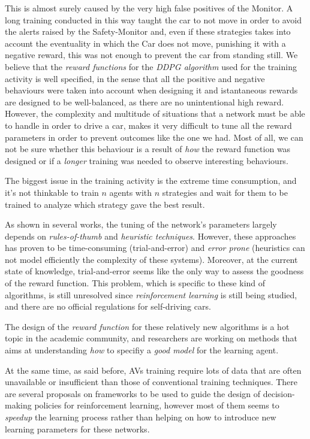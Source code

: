 This is almost surely caused by the very high false positives of the Monitor. A long training conducted in this way taught the car to not move in order to avoid the alerts raised by the Safety-Monitor and, even if these strategies takes into account the eventuality in which the Car does not move, punishing it with a negative reward, this was not enough to prevent the car from standing still.
We believe that the \textsl{reward functions} for the \textsl{DDPG algorithm} used for the training activity is well specified, in the sense that all the positive and negative behaviours were taken into account when designing it and istantaneous rewards are designed to be well-balanced, as there are no unintentional high reward. However, the complexity and multitude of situations that a network must be able to handle in order to drive a car, makes it very difficult to tune all the reward parameters in order to prevent outcomes like the one we had. Most of all, we can not be sure whether this behaviour is a result of \textsl{how} the reward function was designed or if a \textsl{longer} training was needed to observe interesting behaviours.

The biggest issue in the training activity is the extreme time consumption, and it's not thinkable to train $n$ agents with $n$ strategies and wait for them to be trained to analyze which strategy gave the best result.

As shown in several works, the tuning of the network's parameters largely depends on \textsl{rules-of-thumb} and \textsl{heuristic techniques}. However, these approaches has proven to be time-consuming (trial-and-error) and \textsl{error prone} (heuristics can not model efficiently the complexity of these systems).
Moreover, at the current state of knowledge, trial-and-error seems like the only way to assess the goodness of the reward function. This problem, which is specific to these kind of algorithms, is still unresolved since \textsl{reinforcement learning} is still being studied, and there are no official regulations for self-driving cars. \cite{rewardtrialanderror2}

The design of the \textsl{reward function} for these relatively new algorithms is a hot topic in the academic community, and researchers are working on methods that aims at understanding \textsl{how} to specifiy a \textsl{good model} for the learning agent. \cite{reward1} \cite{reward2} \cite{reward3}

At the same time, as said before, AVs training require lots of data that are often unavailable or insufficient than those of conventional training techniques. There are several proposals on frameworks to be used to guide the design of decision-making policies for reinforcement learning, however most of them seems to \textsl{speedup} the learning process rather than helping on how to introduce new learning parameters for these networks. \cite{rewardtrialanderror1}

